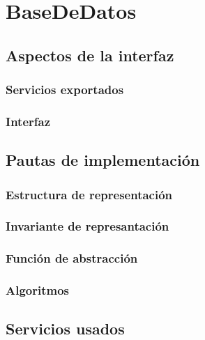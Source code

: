 \section{BaseDeDatos}

\subsection{Aspectos de la interfaz}

\subsubsection{Servicios exportados}

\subsubsection{Interfaz}

\subsection{Pautas de implementación}

\subsubsection{Estructura de representación}

\subsubsection{Invariante de represantación}

\subsubsection{Función de abstracción}

\subsubsection{Algoritmos}

\subsection{Servicios usados}

